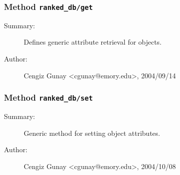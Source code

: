 \subsubsection[Method \texttt{get}]{Method \texttt{ranked\_db/get}}%
%
\label{ref_ranked_db__get}%
\hypertarget{ref_ranked_db__get}{}%
\begin{description}
\item[Summary:]Defines generic attribute retrieval for objects.
%
%
%
%
%
%
%
\item[Author:]%
Cengiz Gunay <cgunay@emory.edu>, 2004/09/14%
\end{description}
\methodline%
\subsubsection[Method \texttt{set}]{Method \texttt{ranked\_db/set}}%
%
\label{ref_ranked_db__set}%
\hypertarget{ref_ranked_db__set}{}%
\begin{description}
\item[Summary:]Generic method for setting object attributes.
%
%
%
%
%
%
%
\item[Author:]%
Cengiz Gunay <cgunay@emory.edu>, 2004/10/08%
\end{description}
\methodline%
